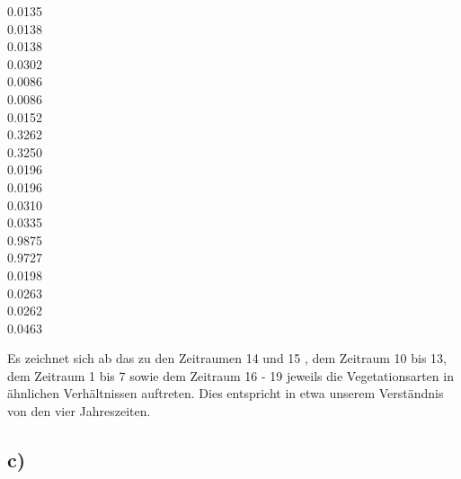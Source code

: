 0.0135      \\
0.0138      \\
0.0138      \\
0.0302      \\
0.0086      \\
0.0086      \\
0.0152      \\
0.3262      \\
0.3250      \\
0.0196      \\
0.0196      \\
0.0310      \\
0.0335      \\
0.9875      \\
0.9727      \\
0.0198      \\
0.0263      \\
0.0262      \\
0.0463      

\hfill



Es zeichnet sich ab das zu den Zeitraumen 14 und 15 , dem Zeitraum 10 bis 13, dem Zeitraum 1 bis 7 sowie dem Zeitraum 16 - 19 jeweils die Vegetationsarten in ähnlichen Verhältnissen auftreten.
Dies entspricht in etwa unserem Verständnis von den vier Jahreszeiten.

\subsection*{c)}

